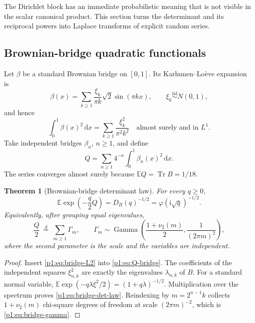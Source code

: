 \documentclass[11pt,oneside]{article}
\newtheorem{theorem}{Theorem}[section]
\theoremstyle{definition}
\newcommand{\dd}{\,\mathrm d}
\newcommand{\ii}{\mathrm i}
\newcommand{\E}{\mathbb E}
\newcommand{\Tr}{\operatorname{Tr}}
\newcommand{\vtwo}{\nu_2}
\newcommand{\phiF}{\varphi}
\begin{document}
The Dirichlet block has an immediate probabilistic meaning that is not visible in the
scalar canonical product.  This section turns the determinant and its reciprocal
powers into Laplace transforms of explicit random series.

\subsection{Brownian-bridge quadratic functionals}

Let \(\beta\) be a standard Brownian bridge on \([0,1]\).  Its Karhunen--Lo\`eve expansion is~\cite{p1:Karhunen1947}
\begin{equation}
 \beta(x)=\sum_{k\ge1}\frac{\xi_k}{\pi k}\sqrt2\sin(\pi kx),
 \qquad \xi_k\stackrel{\mathrm{iid}}{\sim}N(0,1),
 \label{p1:eq:bridge-KL}
\end{equation}
and hence
\begin{equation}
 \int_0^1\beta(x)^2\dd x
 =\sum_{k\ge1}\frac{\xi_k^2}{\pi^2k^2}
 \quad\text{almost surely and in }L^1.
 \label{p1:eq:bridge-L2}
\end{equation}
Take independent bridges \(\beta_n\), \(n\ge1\), and define
\begin{equation}
 Q=\sum_{n\ge1}4^{-n}\int_0^1\beta_n(x)^2\dd x.
 \label{p1:eq:Q-bridge}
\end{equation}
The series converges almost surely because
\(\E Q=\Tr B=1/18\).

\begin{theorem}[Brownian-bridge determinant law]
\label{p1:thm:bridge}
For every \(q\ge0\),
\begin{equation}
 \boxed{\quad
 \E\exp\!\left(-\frac q2Q\right)=D_B(q)^{-1/2}
 =\phiF(\ii\sqrt q)^{-1/2}.
 \quad}
 \label{p1:eq:bridge-det-law}
\end{equation}
Equivalently, after grouping equal eigenvalues,
\begin{equation}
 \frac Q2\ \stackrel{d}=\
 \sum_{m\ge1}\Gamma_m,
 \qquad
 \Gamma_m\sim\operatorname{Gamma}
 \left(\frac{1+\vtwo(m)}2,\frac1{(2\pi m)^2}\right),
 \label{p1:eq:bridge-gamma}
\end{equation}
where the second parameter is the scale and the variables are independent.
\end{theorem}

\begin{proof}
Insert \eqref{p1:eq:bridge-L2} into \eqref{p1:eq:Q-bridge}.  The coefficients of the
independent squares \(\xi_{n,k}^2\) are exactly the eigenvalues
\(\lambda_{n,k}\) of \(B\).  For a standard normal variable,
\(\E\exp(-q\lambda\xi^2/2)=(1+q\lambda)^{-1/2}\).  Multiplication over the spectrum
proves \eqref{p1:eq:bridge-det-law}.  Reindexing by \(m=2^{n-1}k\) collects
\(1+\vtwo(m)\) chi-square degrees of freedom at scale \((2\pi m)^{-2}\), which is
\eqref{p1:eq:bridge-gamma}.
\end{proof}
\end{document}
